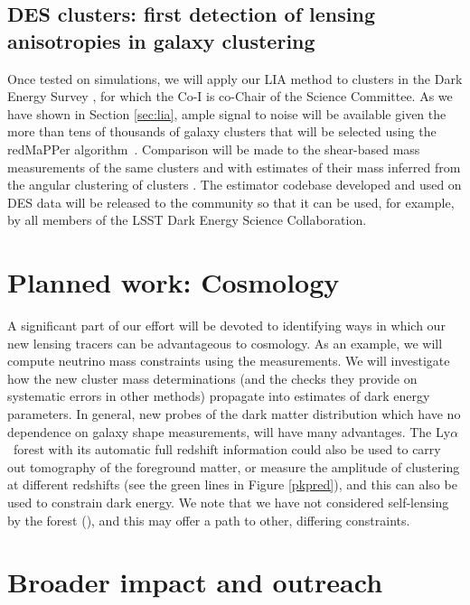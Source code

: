 \documentclass[12pt]{article}
\def\lya{Ly$\alpha$}
\begin{document}
\begin{small}
\subsection{DES clusters: first detection of lensing anisotropies in
galaxy clustering}

Once tested on simulations, we will apply our
LIA method to clusters in the Dark Energy Survey \cite{des2016},
for which the Co-I is co-Chair of the Science Committee. 
As we have shown in Section \ref{sec:lia}, ample signal to noise will be
available given the more than tens of  thousands of galaxy clusters 
that will be selected using the redMaPPer algorithm~\cite{melchior2017}.
Comparison will be made to the shear-based
mass measurements of the same clusters \cite{simet2017} and with
estimates of their mass inferred from the angular clustering
of clusters \cite{baxter2016}.
The estimator codebase developed and used on DES data will
be released to the community so that it can be used, for example, by
all members of the LSST Dark Energy Science Collaboration.

\section{Planned work: Cosmology}

A significant part of our effort will be devoted to identifying ways 
in which our new lensing tracers can be advantageous to cosmology.
As an example, we will compute neutrino mass constraints using the
measurements. We will investigate how the new cluster mass determinations
(and the checks they provide on systematic errors in other methods)
propagate into estimates of dark energy parameters. In general, new probes
of the dark matter distribution which have no dependence on galaxy shape 
measurements, will have many advantages. The \lya\ forest with its automatic
full redshift information could also be used
to carry out tomography of the foreground matter, or measure the amplitude
of clustering at different redshifts (see the green lines in Figure 
\ref{pkpred}), and this can also be used to constrain dark energy. We note 
that  we  have not considered self-lensing by the forest (\cite{loverde2010}),
and this may offer a path to other, differing constraints.


\section{Broader impact and outreach}


\end{small}
\end{document}
